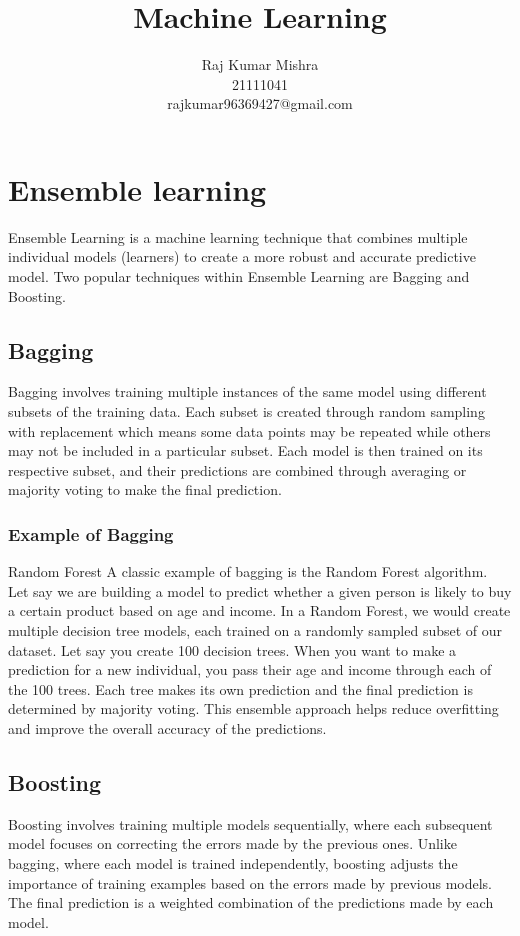 \documentclass[12pt]{article}
\title{Machine Learning}
\author{Raj Kumar Mishra\\21111041\\rajkumar96369427@gmail.com}
\begin{document}
\maketitle
\tableofcontents
\section{Ensemble learning}
Ensemble Learning is a machine learning technique that combines multiple individual models (learners) to create a more robust and accurate predictive model. Two popular techniques within Ensemble Learning are Bagging and Boosting.

\subsection{Bagging}
Bagging involves training multiple instances of the same model using different subsets of the training data. Each subset is created through random sampling with replacement which means some data points may be repeated while others may not be included in a particular subset. Each model is then trained on its respective subset, and their predictions are combined through averaging or majority voting to make the final prediction.

\subsubsection{Example of Bagging}
Random Forest
A classic example of bagging is the Random Forest algorithm. Let say we are building a model to predict whether a given person is likely to buy a certain product based on age and income.  In a Random Forest, we would create multiple decision tree models, each trained on a randomly sampled subset of our dataset. Let say you create 100 decision trees. When you want to make a prediction for a new individual, you pass their age and income through each of the 100 trees. Each tree makes its own prediction and the final prediction is determined by majority voting. This ensemble approach helps reduce overfitting and improve the overall accuracy of the predictions.

\subsection{Boosting}
Boosting involves training multiple models sequentially, where each subsequent model focuses on correcting the errors made by the previous ones. Unlike bagging, where each model is trained independently, boosting adjusts the importance of training examples based on the errors made by previous models. The final prediction is a weighted combination of the predictions made by each model.
\end{document}
